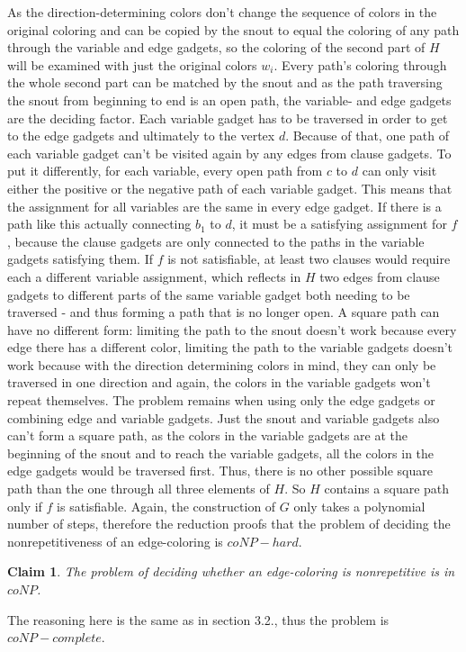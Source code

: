 \documentclass[12pt,a4paper]{article}
\newtheorem{claim}{Claim}
\begin{document}
As the direction-determining colors don't change the sequence of colors in the original coloring and can be copied by the snout to equal the coloring of any path through the variable and edge gadgets, so the coloring of the second part of $H$ will be examined with just the original colors $w_i$. Every path's coloring through the whole second part can be matched by the snout and as the path traversing the snout from beginning to end is an open path, the variable- and edge gadgets are the deciding factor. Each variable gadget has to be traversed in order to get to the edge gadgets and ultimately to the vertex $d$. Because of that, one path of each variable gadget can't be visited again by any edges from clause gadgets. To put it differently, for each variable, every open path from $c$ to $d$ can only visit either the positive or the negative path of each variable gadget. This means that the assignment for all variables are the same in every edge gadget. If there is a path like this actually connecting $b_1$ to $d$, it must be a satisfying assignment for $f$, because the clause gadgets are only connected to the paths in the variable gadgets satisfying them. If $f$ is not satisfiable, at least two clauses would require each a different variable assignment, which reflects in $H$ two edges from clause gadgets to different parts of the same variable gadget both needing to be traversed - and thus forming a path that is no longer open. A square path can have no different form: limiting the path to the snout doesn't work because every edge there has a different color, limiting the path to the variable gadgets doesn't work because with the direction determining colors in mind, they can only be traversed in one direction and again, the colors in the variable gadgets won't repeat themselves. The problem remains when using only the edge gadgets or combining edge and variable gadgets. Just the snout and variable gadgets also can't form a square path, as the colors in the variable gadgets are at the beginning of the snout and to reach the variable gadgets, all the colors in the edge gadgets would be traversed first. Thus, there is no other possible square path than the one through all three elements of $H$. So $H$ contains a square path only if $f$ is satisfiable.
\newline
Again, the construction of $G$ only takes a polynomial number of steps, therefore the reduction proofs that the problem of deciding the nonrepetitiveness of an edge-coloring is $coNP-hard$. 
\begin{claim}
The problem of deciding whether an edge-coloring is nonrepetitive is in $coNP$.
\end{claim}
The reasoning here is the same as in section 3.2., thus the problem is $coNP-complete$.
\end{document}
